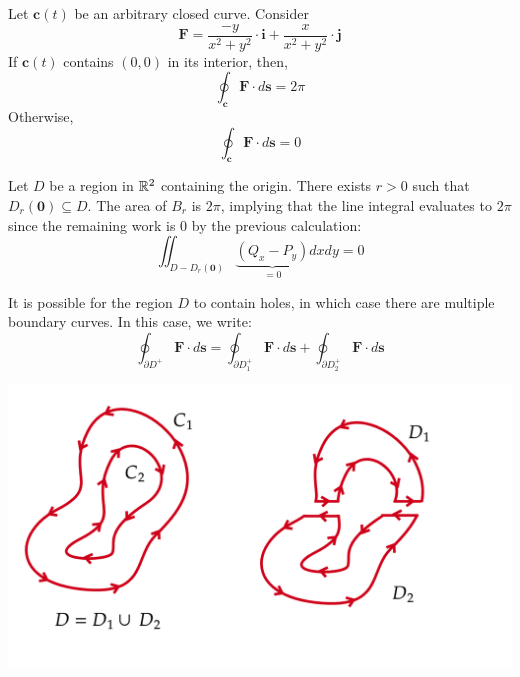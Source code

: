 \hfill 

\begin{rmk}
	Let $\mathbf{c}(t)$ be an arbitrary closed curve. Consider
	\[\mathbf{F}=\frac{-y}{x^2+y^2} \cdot \mathbf{i}+\frac{x}{x^2+y^2} \cdot \mathbf{j}\]
	If $\mathbf{c}(t)$ contains $(0,0)$ in its interior, then,
	\[\oint_{\mathbf{c}} \mathbf{F} \cdot d \mathbf{s} = 2 \pi\]
	Otherwise,
	\[\oint_{\mathbf{c}} \mathbf{F} \cdot d \mathbf{s} = 0\]
\end{rmk}

\begin{marginfigure}
	Let $D$ be a region in $\mathbb{R}^2$ containing the origin. There exists $r > 0$ such that $D_r(\mathbf{0}) \subseteq D$. The area of $B_r$ is $2\pi$, implying that the line integral evaluates to $2\pi$ since the remaining work is 0 by the previous calculation:
	\[\iint_{D - D_r(\mathbf{0})} \underbrace{\left(Q_x-P_y\right)}_{=0}dx d y=0\]
\end{marginfigure}

\hfill 

\noindent It is possible for the region $D$ to contain holes, in which case there are multiple boundary curves. In this case, we write:
\[\oint_{\partial D^{+}} \mathbf{F} \cdot d \mathbf{s}=\oint_{\partial D_1^{+}} \mathbf{F} \cdot d \mathbf{s}+\oint_{\partial D_2^{+}} \mathbf{F} \cdot d \mathbf{s}\]

\hfill

\begin{marginfigure}
	\begin{center}
	\includegraphics[width=\linewidth]{figures/wk-7/fig-2.png}
	\end{center}
\end{marginfigure}


